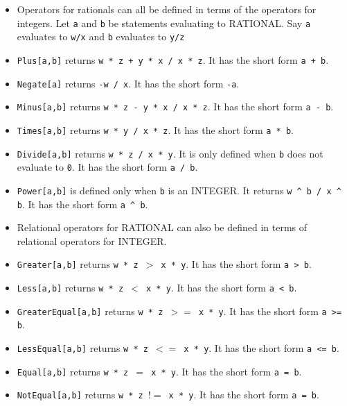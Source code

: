 \begin{itemize}
\item
Operators for rationals can all be defined in terms of the operators
for integers.  Let \verb+a+ and \verb+b+ be statements evaluating to
RATIONAL. Say \verb+a+ evaluates to \verb+w/x+ and \verb+b+ evaluates
to \verb+y/z+

\bd
\item
\verb+Plus[a,b]+ returns \verb&w * z + y * x / x * z&. It has the
short form \verb&a + b&.  
 
\item
\verb+Negate[a]+ returns \verb+-w / x+.  It has the short form \verb&-a&.  
 
\item
\verb+Minus[a,b]+ returns \verb+w * z - y * x / x * z+.  
It has the short form \verb&a - b&.  

\item
\verb+Times[a,b]+ returns \verb+w * y / x * z+.  It has the short form 
\verb+a * b+.

\item
\verb+Divide[a,b]+ returns \verb+w * z / x * y+. It is only defined
when \verb+b+ does not evaluate to \verb+0+.  It has the
short form \verb+a / b+.
\item 
\verb+Power[a,b]+ is defined only when \verb+b+ is an INTEGER.  It 
returns \verb+w ^ b / x ^ b+.  It has the short form \verb+a ^ b+.

\ed
\item
Relational operators for RATIONAL can also be defined in terms of
relational operators for INTEGER.  
\bd
\item
\verb+Greater[a,b]+ returns \verb+w * z +$>$\verb+ x * y+.
It has the short form \verb+a > b+.

\item
\verb+Less[a,b]+ returns \verb+w * z +$<$\verb+ x * y+.
It has the short form \verb+a < b+.

\item
\verb+GreaterEqual[a,b]+ returns \verb+w * z +$>=$\verb+ x * y+.
It has the short form \verb+a >= b+.

\item
\verb+LessEqual[a,b]+ returns \verb+w * z +$<=$\verb+ x * y+.
It has the short form \verb+a <= b+.

\item
\verb+Equal[a,b]+ returns \verb+w * z +$=$\verb+ x * y+.
It has the short form \verb+a = b+.

\item
\verb+NotEqual[a,b]+ returns \verb+w * z +$!=$\verb+ x * y+.
It has the short form \verb+a = b+.
\ed
\end{itemize}

